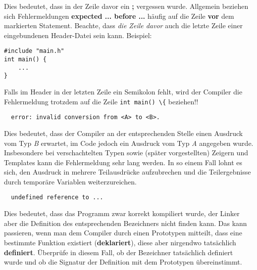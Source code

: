 Dies bedeutet, dass in der Zeile davor ein \textbf{;} vergessen wurde.
Allgemein beziehen sich Fehlermeldungen \textbf{expected ... before ...} häufig auf die Zeile \textbf{vor} dem markierten Statement.
Beachte, dass \emph{die Zeile davor} auch die letzte Zeile einer eingebundenen Header-Datei sein kann. Beispiel:
\begin{lstlisting}[xleftmargin=1cm]
#include "main.h"
int main() {
	...
}
\end{lstlisting}

Falls im Header  in der letzten Zeile ein Semikolon fehlt, wird der Compiler die Fehlermeldung trotzdem auf die Zeile \lstinline{int main() \{} beziehen!!

\begin{verbatim}
  error: invalid conversion from <A> to <B>.
\end{verbatim}

Dies bedeutet, dass der Compiler an der entsprechenden Stelle einen Ausdruck vom Typ \emph{B} erwartet, im Code jedoch ein Ausdruck vom Typ \emph{A} angegeben wurde. Insbesondere bei verschachtelten Typen sowie (später vorgestellten) Zeigern und Templates kann die Fehlermeldung sehr lang werden. In so einem Fall lohnt es sich, den Ausdruck in mehrere Teilausdrücke aufzubrechen und die Teilergebnisse durch temporäre Variablen weiterzureichen.

\begin{verbatim}
  undefined reference to ...
\end{verbatim}

Dies bedeutet, dass das Programm zwar korrekt kompiliert wurde, der Linker aber die Definition des entsprechenden Bezeichners nicht finden kann.
Das kann passieren, wenn man dem Compiler durch einen Prototypen mitteilt, dass eine bestimmte Funktion existiert (\textbf{deklariert}), diese aber nirgendwo tatsächlich \textbf{definiert}.
Überprüfe in diesem Fall, ob der Bezeichner tatsächlich definiert wurde und ob die Signatur der Definition mit dem Prototypen übereinstimmt.


\setlength{\leftskip}{0pt}

